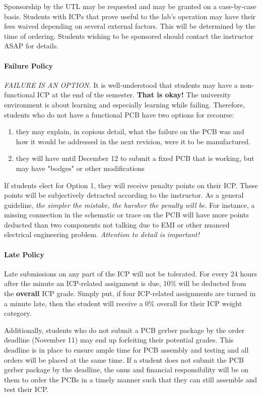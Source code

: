     Sponsorship by the UTL may be requested and may be granted on a case-by-case basis. Students with ICPs that prove useful to the lab's operation may have their fees waived depending on several external factors.
    This will be determined by the time of ordering.
    Students wishing to be sponsored should contact the instructor ASAP for details.

    \paragraph*{Failure Policy} \emph{FAILURE IS AN OPTION.} It is well-understood that students may have a non-functional ICP at the end of the semester. \textbf{That is okay!}
    The university environment is about learning and especially learning while failing.
    Therefore, students who do not have a functional PCB have two options for recourse:
    \begin{enumerate}
        \item they may explain, in copious detail, what the failure on the PCB was and how it would be addressed in the next revision, were it to be manufactured. 
        \item they will have until December 12 to submit a fixed PCB that is working, but may have "bodges" or other modifications
    \end{enumerate}
    If students elect for Option 1, they will receive penalty points on their ICP. These points will be subjectively detracted according to the instructor. As a general guideline, \emph{the simpler the mistake, the harsher the penalty will be}. 
    For instance, a missing connection in the schematic or trace on the PCB will have more points deducted than two components not talking due to EMI or other nuanced electrical engineering problem.
    \emph{Attention to detail is important!}

    \paragraph*{Late Policy} Late submissions on any part of the ICP will not be tolerated. For every 24 hours after the minute an ICP-related assignment is due, 10\% will be deducted from the \textbf{overall} ICP grade.
    Simply put, if four ICP-related assignments are turned in a minute late, then the student will receive a 0\% overall for their ICP weight category.
    
    Additionally, students who do not submit a PCB gerber package by the order deadline (November 11) may end up forfeiting their potential grades.
    This deadline is in place to ensure ample time for PCB assembly and testing and all orders will be placed at the same time.
    If a student does not submit the PCB gerber package by the deadline, the onus and financial responsibility will be on them to order the PCBs in a timely manner such that they can still assemble and test their ICP.

